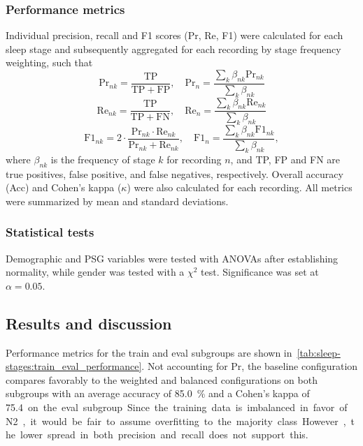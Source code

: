 
\subsubsection{Performance metrics}
Individual precision, recall and F1 scores (Pr, Re, F1) were calculated for each sleep stage and subsequently aggregated for each recording by stage frequency weighting, such that
\begin{equation}
    \mathrm{Pr}_{nk} = \frac{\mathrm{TP}}{\mathrm{TP} + \mathrm{FP}}, \quad \mathrm{Pr}_{n} = \frac{\sum_{k}{\beta_{nk} \mathrm{Pr}_{nk}}}{\sum_{k}\beta_{nk}}
\end{equation}
\begin{equation}
    \mathrm{Re}_{nk} = \frac{\mathrm{TP}}{\mathrm{TP} + \mathrm{FN}}, \quad \mathrm{Re}_{n} = \frac{\sum_{k}{\beta_{nk} \mathrm{Re}_{nk}}}{\sum_{k}\beta_{nk}}
\end{equation}
\begin{equation}
    \mathrm{F1}_{nk} = 2 \cdot \frac{\mathrm{Pr}_{nk} \cdot \mathrm{Re}_{nk}}{\mathrm{Pr}_{nk} + \mathrm{Re}_{nk}}, \quad \mathrm{F1}_{n} = \frac{\sum_{k}{\beta_{nk} \mathrm{F1}_{nk}}}{\sum_{k}\beta_{nk}},
\end{equation}
where $\beta_{nk}$ is the frequency of stage $k$ for recording $n$, and TP, FP and FN are true positives, false positive, and false negatives, respectively. 
Overall accuracy (Acc) and Cohen's kappa ($\kappa$) were also calculated for each recording.
All metrics were summarized by mean and standard deviations.

\subsubsection{Statistical tests}
Demographic and \ac{PSG} variables were tested with \acp{ANOVA} after establishing normality, while gender was tested with a $\chi^{2}$ test.
Significance was set at $\alpha=0.05$.

\subsection{Results and discussion}
Performance metrics for the train and eval subgroups are shown in~\cref{tab:sleep-stages:train_eval_performance}.
Not accounting for Pr, the baseline configuration compares favorably to the weighted and balanced configurations on both subgroups with an average accuracy of \SI{85.0}{\percent} and a Cohen's kappa of \SI{75.4} on the eval subgroup.
Since the training data is imbalanced in favor of \ac{N2}, it would be fair to assume overfitting to the majority class.
However, the lower spread in both precision and recall does not support this.

